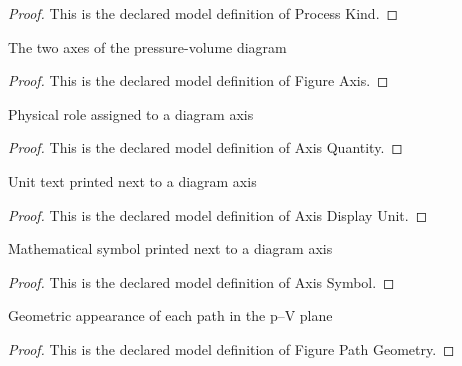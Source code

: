 \begin{proof}
  This is the declared model definition of Process Kind.
\end{proof}
\begin{definition}
  \label{def:physics:phyx-mini-0415:phyxminiproblems-problemphyxmini0415-figureaxis}
  The two axes of the pressure-volume diagram
\end{definition}
\begin{proof}
  This is the declared model definition of Figure Axis.
\end{proof}
\begin{definition}
  \label{def:physics:phyx-mini-0415:phyxminiproblems-problemphyxmini0415-axisquantity}
  Physical role assigned to a diagram axis
\end{definition}
\begin{proof}
  This is the declared model definition of Axis Quantity.
\end{proof}
\begin{definition}
  \label{def:physics:phyx-mini-0415:phyxminiproblems-problemphyxmini0415-axisdisplayunit}
  Unit text printed next to a diagram axis
\end{definition}
\begin{proof}
  This is the declared model definition of Axis Display Unit.
\end{proof}
\begin{definition}
  \label{def:physics:phyx-mini-0415:phyxminiproblems-problemphyxmini0415-axissymbol}
  Mathematical symbol printed next to a diagram axis
\end{definition}
\begin{proof}
  This is the declared model definition of Axis Symbol.
\end{proof}
\begin{definition}
  \label{def:physics:phyx-mini-0415:phyxminiproblems-problemphyxmini0415-figurepathgeometry}
  Geometric appearance of each path in the p--V plane
\end{definition}
\begin{proof}
  This is the declared model definition of Figure Path Geometry.
\end{proof}
